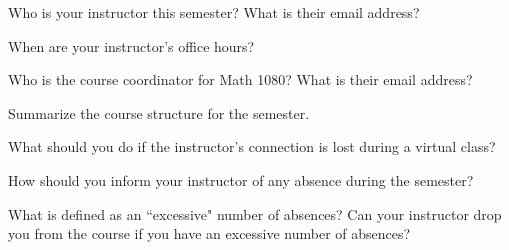 \documentclass{exam}
\numberwithin{equation}{section} %
\numberwithin{figure}{section} %
\numberwithin{table}{section} %
\begin{document}
\newpage
\begin{questions}
\question Who is your instructor this semester? What is their email address?
\begin{solution}[\stretch{1}]
\end{solution}

\question When are your instructor's office hours? 
\begin{solution}[\stretch{1}]

\end{solution}

\question Who is the course coordinator for Math 1080? What is their email address?
\begin{solution}[\stretch{1}]

\end{solution}


\question Summarize the course structure for the semester.
\begin{solution}[\stretch{2}]

\end{solution}


\question What should you do if the instructor's connection is lost during a virtual class?
\begin{solution}[\stretch{1}]

\end{solution}

\newpage

\question How should you inform your instructor of any absence during the semester?
\begin{solution}[\stretch{1}]

\end{solution}

\question What is defined as an ``excessive" number of absences? Can your instructor drop you from the course if you have an excessive number of absences?
\begin{solution}[\stretch{1}]


\end{solution}
\end{questions}
\end{document}

